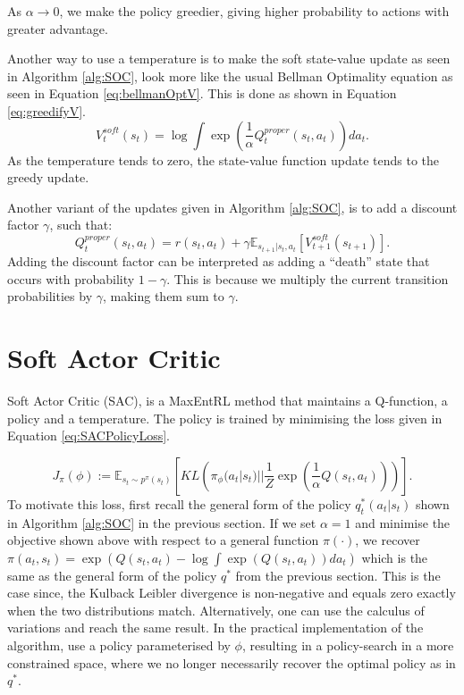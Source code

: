 \documentclass{report}
\numberwithin{equation}{section}
\numberwithin{figure}{section}
\numberwithin{table}{section}
\numberwithin{algorithm}{section}
\begin{document}
As $\alpha\rightarrow 0$, we make the policy greedier, giving 
higher probability to actions with greater advantage.

Another way to use a temperature is to make the soft state-value 
update as seen in Algorithm \ref{alg:SOC}, look more like the 
usual Bellman Optimality equation as seen in Equation \ref{eq:bellmanOptV}.
This is done as shown in Equation \ref{eq:greedifyV}.
\begin{equation}\label{eq:greedifyV}
  V^{soft}_t(s_t)=\log \int \exp(\frac{1}{\alpha}Q^{proper}_t(s_t,a_t))da_t.
\end{equation}
As the temperature tends to zero, the state-value function update 
tends to the greedy update.

Another variant of the updates given in Algorithm \ref{alg:SOC}, 
is to add a discount factor $\gamma$, such that:
\begin{equation*}
  Q^{proper}_t(s_t,a_t)=r(s_t,a_t) + \gamma \mathbb{E}_{s_{t+1}|s_t,a_t}[V^{soft}_{t+1}(s_{t+1})].
\end{equation*}
Adding the discount factor can be interpreted as adding a ``death'' 
state that occurs with probability $1-\gamma$. This is because 
we multiply the current transition probabilities by $\gamma$, making 
them sum to $\gamma$.

\section{Soft Actor Critic}
Soft Actor Critic (SAC), is a MaxEntRL method that maintains 
a Q-function, a policy and a temperature. The policy 
is trained by minimising the loss given in Equation \ref{eq:SACPolicyLoss}.

\begin{equation}\label{eq:SACPolicyLoss}
  J_\pi(\phi):=\mathbb{E}_{s_t\sim p^\pi(s_t)}\left[KL\left(\pi_\phi(a_t|s_t)||\frac{1}{Z}\exp\left(\frac{1}{\alpha}Q(s_t,a_t)\right)\right)\right].
\end{equation}
To motivate this loss, first recall the general form of the policy 
$q^*_t(a_t|s_t)$ shown in Algorithm \ref{alg:SOC} in the previous
section. If we set $\alpha=1$ and 
minimise the objective shown above with respect to a general function 
$\pi(\cdot)$, we recover $\pi(a_t,s_t)=\exp(Q(s_t,a_t) - \log \int \exp(Q(s_t,a_t))da_t)$ 
which is the same as the general form of the policy $q^*$ from 
the previous section. This is the case since, the Kulback Leibler 
divergence is non-negative and equals zero exactly when the 
two distributions match. Alternatively, one can use the 
calculus of variations and reach the same result. In 
the practical implementation of the algorithm, \cite{SAC2} use 
a policy parameterised by $\phi$, resulting in a policy-search 
in a more constrained space, where we no longer necessarily recover 
the optimal policy as in $q^*$.
\end{document}
